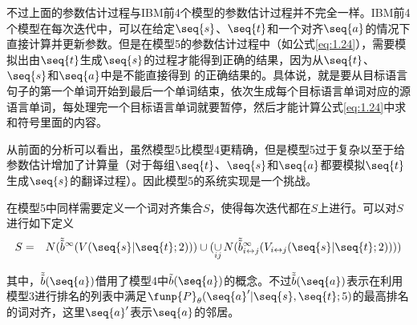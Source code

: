 \begin{appendices}
\parinterval 不过上面的参数估计过程与IBM前4个模型的参数估计过程并不完全一样。IBM前4个模型在每次迭代中，可以在给定$\seq{s}$、$\seq{t}$和一个对齐$\seq{a}$的情况下直接计算并更新参数。但是在模型5的参数估计过程中（如公式\eqref{eq:1.24}），需要模拟出由$\seq{t}$生成$\seq{s}$的过程才能得到正确的结果，因为从$\seq{t}$、$\seq{s}$和$\seq{a}$中是不能直接得到 的正确结果的。具体说，就是要从目标语言句子的第一个单词开始到最后一个单词结束，依次生成每个目标语言单词对应的源语言单词，每处理完一个目标语言单词就要暂停，然后才能计算公式\eqref{eq:1.24}中求和符号里面的内容。

\parinterval 从前面的分析可以看出，虽然模型5比模型4更精确，但是模型5过于复杂以至于给参数估计增加了计算量（对于每组$\seq{t}$、$\seq{s}$和$\seq{a}$都要模拟$\seq{t}$生成$\seq{s}$的翻译过程）。因此模型5的系统实现是一个挑战。

\parinterval 在模型5中同样需要定义一个词对齐集合$S$，使得每次迭代都在$S$上进行。可以对$S$进行如下定义
\begin{eqnarray}
S &=& N(\tilde{\tilde{b}}^{\infty}(V(\seq{s}|\seq{t};2))) \cup (\mathop{\cup}\limits_{ij} N(\tilde{\tilde{b}}_{i \leftrightarrow j}^{\infty}(V_{i \leftrightarrow j}(\seq{s}|\seq{t};2))))
\label{eq:1.29}
\end{eqnarray}
\vspace{0.5em}

\noindent 其中，$\tilde{\tilde{b}}(\seq{a})$借用了模型4中$\tilde{b}(\seq{a})$的概念。不过$\tilde{\tilde{b}}(\seq{a})$表示在利用模型3进行排名的列表中满足$\funp{P}_{\theta}(\seq{a}'|\seq{s},\seq{t};5)$的最高排名的词对齐，这里$\seq{a}'$表示$\seq{a}$的邻居。
\end{appendices}














